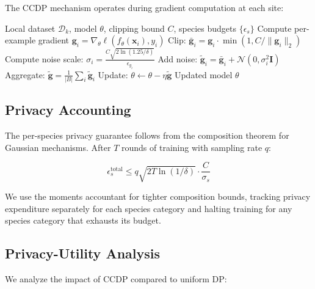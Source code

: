 \documentclass[11pt,a4paper]{article}
\begin{document}
The CCDP mechanism operates during gradient computation at each site:

\begin{algorithm}[H]
\caption{Conservation-Calibrated DP-SGD (per-site, per-round)}
\label{alg:ccdp}
\begin{algorithmic}[1]
\REQUIRE Local dataset $\mathcal{D}_k$, model $\theta$, clipping bound $C$, species budgets $\{\epsilon_s\}$
        \STATE Compute per-example gradient $\mathbf{g}_i = \nabla_\theta \ell(f_\theta(\mathbf{x}_i), y_i)$
        \STATE Clip: $\bar{\mathbf{g}}_i = \mathbf{g}_i \cdot \min(1, C / \|\mathbf{g}_i\|_2)$
        \STATE Compute noise scale: $\sigma_i = \frac{C \sqrt{2 \ln(1.25/\delta)}}{\epsilon_{y_i}}$
        \STATE Add noise: $\tilde{\mathbf{g}}_i = \bar{\mathbf{g}}_i + \mathcal{N}(0, \sigma_i^2 \mathbf{I})$
    \ENDFOR
    \STATE Aggregate: $\tilde{\mathbf{g}} = \frac{1}{|B|} \sum_i \tilde{\mathbf{g}}_i$
    \STATE Update: $\theta \leftarrow \theta - \eta \tilde{\mathbf{g}}$
\ENDFOR
\RETURN Updated model $\theta$
\end{algorithmic}
\end{algorithm}

\subsection{Privacy Accounting}

The per-species privacy guarantee follows from the composition theorem for Gaussian mechanisms.
After $T$ rounds of training with sampling rate $q$:

\begin{equation}
    \epsilon_s^{\text{total}} \leq q \sqrt{2T \ln(1/\delta)} \cdot \frac{C}{\sigma_s}
\end{equation}

We use the moments accountant \citep{abadi2016deep} for tighter composition bounds, tracking privacy expenditure separately for each species category and halting training for any species category that exhausts its budget.

\subsection{Privacy-Utility Analysis}

We analyze the impact of CCDP compared to uniform DP:
\end{document}
